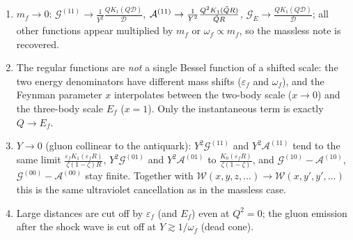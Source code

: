 \documentclass[9pt]{article}
\newcommand{\eps}{\varepsilon_{f}}           %
\newcommand{\om}{\omega_{f}}                 %
\newcommand{\Ef}{E_{f}}                      %
\newcommand{\G}[1]{\mathcal{G}^{(#1)}}       %
\newcommand{\Ga}[1]{\mathcal{A}^{(#1)}}      %
\newcommand{\GE}{\mathcal{G}_{E}}            %
\numberwithin{equation}{section}
\begin{document}
\begin{enumerate}
    \item $m_{f}\rightarrow 0$: $\G{11}\rightarrow\frac{1}{Y^{2}}\frac{QK_{1}(Q\mathcal{D})}{\mathcal{D}}$, $\Ga{11}\rightarrow\frac{1}{Y^{2}}\frac{Q^{2}K_{1}(\Tilde{Q}R)}{\Tilde{Q}R}$, $\GE\rightarrow\frac{QK_{1}(Q\mathcal{D})}{\mathcal{D}}$; all other functions appear multiplied by $m_{f}$ or $\om\propto m_{f}$, so the massless note is recovered.
    \item The regular functions are \emph{not} a single Bessel function of a shifted scale: the two energy denominators have different mass shifts ($\eps$ and $\om$), and the Feynman parameter $x$ interpolates between the two-body scale ($x\rightarrow 0$) and the three-body scale $\Ef$ ($x=1$). Only the instantaneous term is exactly $Q\rightarrow\Ef$.
    \item $Y\rightarrow 0$ (gluon collinear to the antiquark): $Y^{2}\G{11}$ and $Y^{2}\Ga{11}$ tend to the same limit $\frac{\eps K_{1}(\eps R)}{\zeta(1-\zeta)R}$, $Y^{2}\G{01}$ and $Y^{2}\Ga{01}$ to $\frac{K_{0}(\eps R)}{\zeta(1-\zeta)}$, and $\G{10}-\Ga{10}$, $\G{00}-\Ga{00}$ stay finite. Together with $\mathcal{W}(x,y,z,\ldots)\rightarrow\mathcal{W}(x,y',y',\ldots)$ this is the same ultraviolet cancellation as in the massless case.
    \item Large distances are cut off by $\eps$ (and $\Ef$) even at $Q^{2}=0$; the gluon emission after the shock wave is cut off at $Y\gtrsim 1/\om$ (dead cone).
\end{enumerate}
\end{document}
